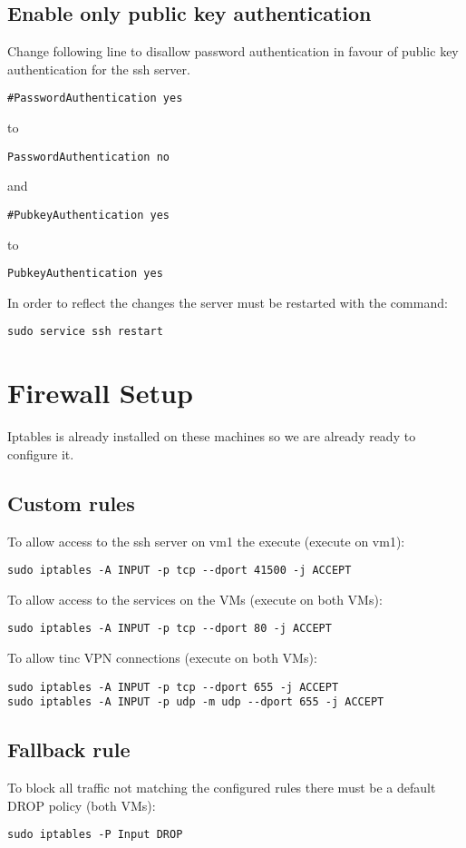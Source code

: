 \documentclass[10pt,a4paper]{article}
\begin{document}
\subsection{Enable only public key authentication}
Change following line to disallow password authentication in favour of public key authentication for the ssh server.

\begin{verbatim}
#PasswordAuthentication yes
\end{verbatim}
to
\begin{verbatim}
PasswordAuthentication no
\end{verbatim}
and
\begin{verbatim}
#PubkeyAuthentication yes
\end{verbatim}
to
\begin{verbatim}
PubkeyAuthentication yes
\end{verbatim}

In order to reflect the changes the server must be restarted with the command:
\begin{verbatim}
sudo service ssh restart
\end{verbatim}

\newpage
\section{Firewall Setup}
Iptables is already installed on these machines so we are already ready to configure it.

\subsection{Custom rules}
To allow access to the ssh server on vm1 the execute (execute on vm1):
\begin{verbatim}
sudo iptables -A INPUT -p tcp --dport 41500 -j ACCEPT
\end{verbatim}

To allow access to the services on the VMs (execute on both VMs):
\begin{verbatim}
sudo iptables -A INPUT -p tcp --dport 80 -j ACCEPT
\end{verbatim}

To allow tinc VPN connections (execute on both VMs):
\begin{verbatim}
sudo iptables -A INPUT -p tcp --dport 655 -j ACCEPT
sudo iptables -A INPUT -p udp -m udp --dport 655 -j ACCEPT
\end{verbatim}

\subsection{Fallback rule}
To block all traffic not matching the configured rules there must be a default DROP policy (both VMs):
\begin{verbatim}
sudo iptables -P Input DROP
\end{verbatim}
\end{document}
